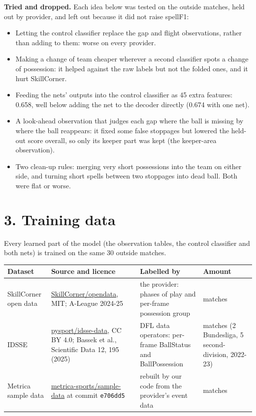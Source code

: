 \documentclass[11pt,a4paper]{article}
\newcommand{\code}[1]{\texttt{#1}}
\begin{document}
\textbf{Tried and dropped.} Each idea below was tested on the outside matches, held out by provider, and left out because it did not raise spellF1:
\begin{itemize}
  \item Letting the control classifier replace the gap and flight observations, rather than adding to them: worse on every provider.
  \item Making a change of team cheaper wherever a second classifier spots a change of possession: it helped against the raw labels but not the folded ones, and it hurt SkillCorner.
  \item Feeding the nets' outputs into the control classifier as 45 extra features: 0.658, well below adding the net to the decoder directly (0.674 with one net).
  \item A look-ahead observation that judges each gap where the ball is missing by where the ball reappears: it fixed some false stoppages but lowered the held-out score overall, so only its keeper part was kept (the keeper-area observation).
  \item Two clean-up rules: merging very short possessions into the team on either side, and turning short spells between two stoppages into dead ball. Both were flat or worse.
\end{itemize}

\section{3. Training data}

Every learned part of the model (the observation tables, the control classifier and both nets) is trained on the same 30 outside matches.

\begin{center}
\small
\begin{tabularx}{\linewidth}{@{}>{\raggedright\arraybackslash}p{24mm}>{\raggedright\arraybackslash}X>{\raggedright\arraybackslash}p{40mm}>{\raggedright\arraybackslash}p{26mm}@{}}
\toprule
\sffamily\bfseries Dataset & \sffamily\bfseries Source and licence & \sffamily\bfseries Labelled by & \sffamily\bfseries Amount \\
\midrule
SkillCorner open data & \href{https://github.com/SkillCorner/opendata}{SkillCorner/opendata}, MIT; A-League 2024-25 & the provider: phases of play and per-frame possession group & 20 matches \\
IDSSE & \href{https://huggingface.co/datasets/pysport/idsse-data}{pysport/idsse-data}, CC BY 4.0; Bassek et al., Scientific Data 12, 195 (2025) & DFL data operators: per-frame BallStatus and BallPossession & 7 matches (2 Bundesliga, 5 second-division, 2022-23) \\
Metrica sample data & \href{https://github.com/metrica-sports/sample-data}{metrica-sports/sample-data} at commit \code{e706dd5} & rebuilt by our code from the provider's event data & 3 matches \\
\bottomrule
\end{tabularx}
\end{center}
\end{document}
